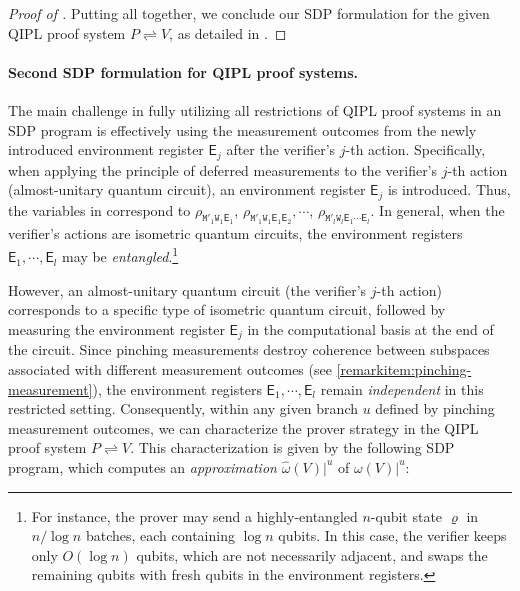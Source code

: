 \documentclass[10pt,a4paper]{article}
\numberwithin{equation}{section}
\numberwithin{figure}{section}
\newcommand{\QIPL}{\textnormal{\textsf{QIPL}}\xspace}
\newcommand{\protocol}[2]{{#1}\!\rightleftharpoons\!{#2}}
\newcommand{\sfE}{\mathsf{E}}
\newcommand{\ttM}{\mathtt{M}}
\newcommand{\ttW}{\mathtt{W}}
\begin{document}
\begin{proof}[Proof of ]
    Putting  all together, we conclude our SDP formulation for the given \QIPL{} proof system $\protocol{P}{V}$, as detailed in .
\end{proof}

\paragraph{Second SDP formulation for \QIPL{} proof systems.} 

The main challenge in fully utilizing all restrictions of \QIPL{} proof systems in an SDP program is effectively using the measurement outcomes from the newly introduced environment register $\sfE_j$ after the verifier's $j$-th action. Specifically, when applying the principle of deferred measurements to the verifier's $j$-th action (almost-unitary quantum circuit), an environment register $\sfE_j$ is introduced. 
Thus, the variables in  correspond to $\rho_{\ttM'_1\ttW_1\sfE_1}$, $\rho_{\ttM'_1\ttW_1\sfE_1\sfE_2}, \cdots$, $\rho_{\ttM'_l\ttW_l\sfE_1\cdots\sfE_l}$. In general, when the verifier's actions are isometric quantum circuits, the environment registers $\sfE_1,\cdots,\sfE_l$ may be \textit{entangled}.\footnote{For instance, the prover may send a highly-entangled $n$-qubit state $\varrho$ in $n/\log{n}$ batches, each containing $\log{n}$ qubits. In this case, the verifier keeps only $O(\log n)$ qubits, which are not necessarily adjacent, and swaps the remaining qubits with fresh qubits in the environment registers.}

However, an almost-unitary quantum circuit (the verifier's $j$-th action) corresponds to a specific type of isometric quantum circuit, followed by measuring the environment register $\sfE_j$ in the computational basis at the end of the circuit. 
Since pinching measurements destroy coherence between subspaces associated with different measurement outcomes (see \ref{remarkitem:pinching-measurement}), the environment registers $\sfE_1,\cdots,\sfE_l$ remain \textit{independent} in this restricted setting. 
Consequently, within any given branch $u$ defined by pinching measurement outcomes, we can characterize the prover strategy in the \QIPL{} proof system $\protocol{P}{V}$. This characterization is given by the following SDP program, which computes an \textit{approximation} $\widehat{\omega}(V)|^u$ of $\omega(V)|^u$: 
\end{document}
